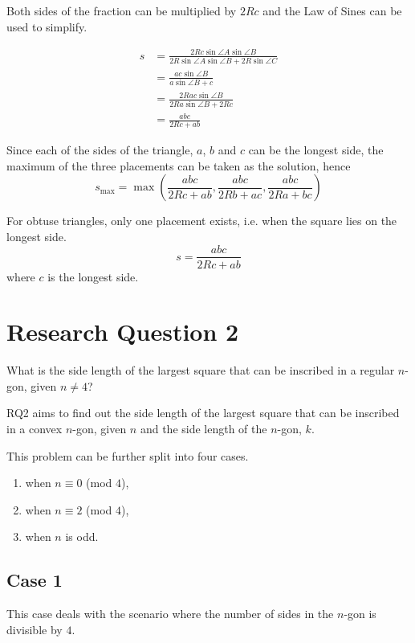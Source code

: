 \documentclass[12pt]{scrartcl}
\begin{document}
Both sides of the fraction can be multiplied by $2Rc$ and the Law of Sines can be used to simplify.

\begin{align*}
	 s & = \frac{2Rc\sin\angle{A}\sin\angle{B}}{2R\sin\angle{A}\sin \angle{B}+2R\sin \angle C}                                  \\
	  & = \frac{ac\sin\angle{B}}{a\sin\angle{B}+c}                                                                             \\
	  & = \frac{2Rac\sin\angle{B}}{2Ra\sin\angle{B}+2Rc}                                                                       \\
	  & = \frac{abc}{2Rc+ab}
\end{align*}

Since each of the sides of the triangle, $a$, $b$ and $c$ can be the longest side,
the maximum of the three placements can be taken as the solution, hence
\begin{equation}
	s_{\text{max}} = \max\left(\dfrac{abc}{2Rc+ab},\dfrac{abc}{2Rb+ac},\dfrac{abc}{2Ra+bc}\right)
\end{equation}

For obtuse triangles, only one placement exists, i.e. when the square lies on the longest side.
\begin{equation}
	s = \dfrac{abc}{2Rc+ab}
\end{equation}
where $c$ is the longest side.

\pagebreak

\section{Research Question 2}
What is the side length of the largest square that can be inscribed in a regular $n$-gon, given $n \neq 4$?

RQ2 aims to find out the side length of the largest square that can be inscribed in a convex $n$-gon,
given $n$ and the side length of the $n$-gon, $k$.

This problem can be further split into four cases.
\begin{enumerate}
	\item when \(n \equiv 0\) (mod $4$),
	\item when \(n \equiv 2\) (mod $4$),
	\item when $n$ is odd.
\end{enumerate}

\subsection{Case 1}
This case deals with the scenario where the number of sides in the $n$-gon is divisible by $4$.
\end{document}
